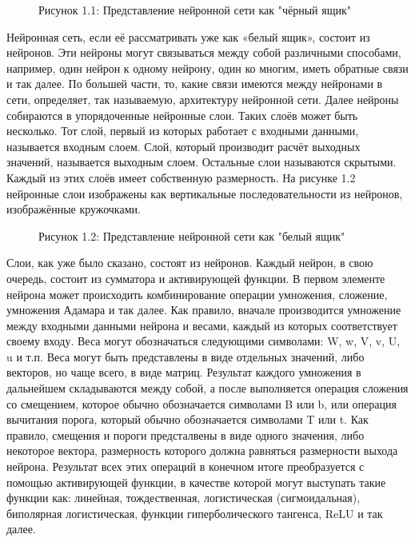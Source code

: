 {  \begin{figure}[htb]
    \centering
    \def\svgwidth{\textwidth}
    
    \caption*{\gostFont Рисунок 1.1: Представление нейронной сети как "чёрный ящик"}
    \label{fig:NNBlackBox}
  \end{figure}

  \par \redline Нейронная сеть, если её рассматривать уже как «белый ящик», состоит из нейронов. Эти нейроны могут связываться между собой различными способами, например, один нейрон к одному нейрону, один ко многим, иметь обратные связи и так далее. По большей части, то, какие связи имеются между нейронами в сети, определяет, так называемую, архитектуру нейронной сети. Далее нейроны собираются в упорядоченные нейронные слои. Таких слоёв может быть несколько. Тот слой, первый из которых работает с входными данными, называется входным слоем. Слой, который производит расчёт выходных значений, называется выходным слоем. Остальные слои называются скрытыми. Каждый из этих слоёв имеет собственную размерность. На рисунке 1.2 нейронные слои изображены как вертикальные последовательности из нейронов, изображённые кружочками.

  \begin{figure}[htb]
    \centering
    \def\svgwidth{\textwidth}
    
    \caption*{\gostFont Рисунок 1.2: Представление нейронной сети как "белый ящик"}
    \label{fig:NNWhiteBox}
  \end{figure}

  \par \redline Слои, как уже было сказано, состоят из нейронов. Каждый нейрон, в свою очередь, состоит из сумматора и активирующей функции. В первом элементе нейрона может происходить комбинирование операции умножения, сложение, умножения Адамара и так далее. Как правило, вначале производится умножение между входными данными нейрона и весами, каждый из которых соответствует своему входу. Веса могут обозначаться следующими символами: W, w, V, v, U, u и т.п. Веса могут быть представлены в виде отдельных значений, либо векторов, но чаще всего, в виде матриц. Результат каждого умножения в дальнейшем складываются между собой, а после выполняется операция сложения со смещением, которое обычно обозначается символами B или b, или операция вычитания порога, который обычно обозначается символами T или t. Как правило, смещения и пороги предсталвены в виде одного значения, либо некоторое вектора, размерность которого должна равняться размерности выхода нейрона.  Результат всех этих операций в конечном итоге преобразуется с помощью активирующей функции, в качестве которой могут выступать такие функции как: линейная, тождественная, логистическая (сигмоидальная), биполярная логистическая, функции гиперболического тангенса, ReLU и так далее.  

}
